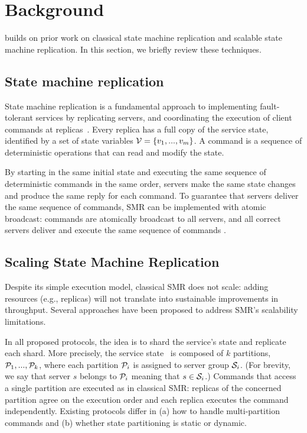 \section{Background}
\label{sec:background}


\dynastar builds on prior work on classical state machine replication and scalable state machine replication.
In this section, we briefly review these techniques. 

\subsection{State machine replication}
\label{sec:smr}

State machine replication is a fundamental approach to implementing fault-tolerant services by replicating servers, and coordinating the execution of client commands at replicas~\cite{Lam78,Sch90}. 
Every replica has a full copy of the service state, identified by a set of state variables $\mathcal{V} = \{v_1, ..., v_m\}$.
A command is a sequence of deterministic operations that can read and modify the state.

By starting in the same initial state and executing the same sequence of deterministic commands in the same order, servers make the same state changes and produce the same reply for each command. 
To guarantee that servers deliver the same sequence of commands, SMR can be implemented with atomic broadcast: commands are atomically broadcast to all servers, and all correct servers deliver and execute the same sequence of commands \cite{BJ87b,DSU04}.


\subsection{Scaling State Machine Replication}

Despite its simple execution model, classical SMR does not scale: adding resources (e.g., replicas) will not translate into sustainable improvements in throughput. 
Several approaches have been proposed to address SMR's scalability limitations.

In all proposed protocols, the idea is to shard the service's state and replicate each shard.
More precisely, the service state \vvt\ is composed of $k$ partitions, $\mathcal{P}_1, ..., \mathcal{P}_k$, where each partition $\mathcal{P}_i$ is assigned to server group $\mathcal{S}_i$. 
(For brevity, we say that server $s$ belongs to $\mathcal{P}_i$ meaning that $s \in \mathcal{S}_i$.)
%
Commands that access a single partition are executed as in classical SMR: replicas of the concerned partition agree on the execution order and each replica executes the command independently. 
Existing protocols differ in (a) how to handle multi-partition commands and (b) whether state partitioning is static or dynamic.


